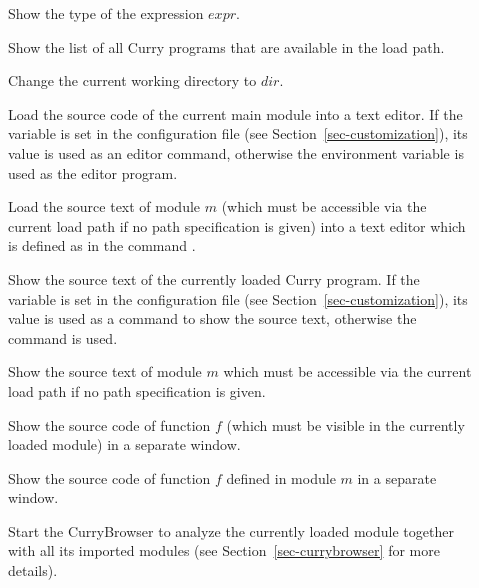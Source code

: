 \begin{description}
\item[]
Show the type of the expression $expr$.

\item[]
Show the list of all Curry programs that are available in the load path.

\item[]
Change the current working directory to $dir$.

\item[]
Load the source code of the current main module into a text editor.
If the variable  is set in the
configuration file 
(see Section~\ref{sec-customization}),
its value is used as an editor command, otherwise
the environment variable  is used as the editor program.

\item[]
Load the source text of module $m$ (which must be accessible
via the current load path if no path specification is given)
into a text editor which is defined
as in the command .

\item[]
Show the source text of the currently loaded Curry program.
If the variable  is set in the
configuration file 
(see Section~\ref{sec-customization}),
its value is used as a command to show the source text,
otherwise the command  is used.

\item[]
Show the source text of module $m$ which must be accessible
via the current load path if no path specification is given.

\item[]
Show the source code of function $f$ (which must be visible
in the currently loaded module) in a separate window.

\item[]
Show the source code of function $f$ defined in module $m$
in a separate window.

\item[]
Start the CurryBrowser to analyze the currently loaded
module together with all its imported modules
(see Section~\ref{sec-currybrowser} for more details).


\end{description}
